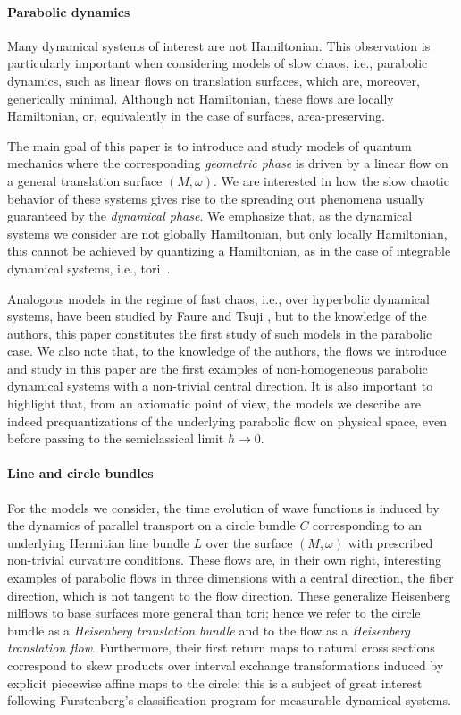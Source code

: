 \documentclass{amsart}
\theoremstyle{definition}
\theoremstyle{remark}
\numberwithin{equation}{section}
\newcommand{\<}{{\langle}}
\renewcommand{\>}{{\rangle}}
\begin{document}
\paragraph*{\bf Parabolic dynamics} Many dynamical systems of interest are not Hamiltonian. This observation is particularly important when considering models of slow chaos, i.e., parabolic dynamics, such as linear flows on translation surfaces, which are, moreover, generically minimal. Although not Hamiltonian, these flows are locally Hamiltonian, or, equivalently in the case of surfaces, area-preserving. 

The main goal of this paper is to introduce and study models of quantum mechanics where the corresponding \textit{geometric phase} is driven by a linear flow on a general translation surface $(M, \omega)$. We are interested in how the slow  chaotic behavior of these systems gives rise to the spreading out phenomena usually guaranteed by the \textit{dynamical phase}. We emphasize that, as the dynamical systems we consider are not globally Hamiltonian, but only locally Hamiltonian, this cannot be achieved by quantizing a Hamiltonian,  as in the case of integrable dynamical systems, i.e., tori~\cite{Faure07}.

Analogous models in the regime of fast chaos, i.e., over hyperbolic dynamical systems, have been studied by Faure and Tsuji \cite{FT15}, but to the knowledge of the authors, this paper constitutes the first study of such models in the parabolic case. We also note that, to the knowledge of the authors, the flows we introduce and study in this paper are the first examples of non-homogeneous parabolic dynamical systems with a non-trivial central direction. It is also important to highlight that, from an axiomatic point of view, the models we describe are indeed prequantizations of the underlying parabolic flow on physical space, even before passing to the semiclassical limit $\hbar \to 0$.\\

\paragraph*{\bf Line and circle bundles} For the models we consider, the time evolution of wave functions is induced by the dynamics of parallel transport on a circle bundle $C$ corresponding to an underlying Hermitian line bundle $L$ over the surface $(M, \omega)$ with prescribed non-trivial curvature conditions. These flows are, in their own right, interesting examples of parabolic flows in three dimensions with a central direction, the fiber direction, which is not tangent to the flow direction. These generalize Heisenberg nilflows to base surfaces more general than tori; hence we refer to the circle bundle as a \textit{Heisenberg translation bundle} and to the flow as a \textit{Heisenberg translation flow}. Furthermore, their first return maps to natural cross sections correspond to skew products over interval exchange transformations induced by explicit piecewise affine maps to the circle; this is a subject of great interest following Furstenberg's classification program for measurable dynamical systems.\\
\end{document}
